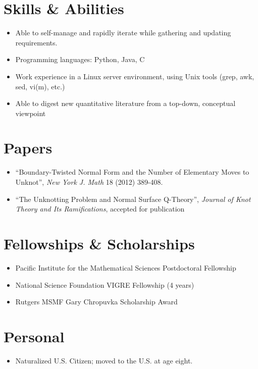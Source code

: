 \documentclass[margin]{res}
\def\tightlist{}
\begin{document}
\begin{resume}
\section{Skills \& Abilities}\label{skills-abilities}

\begin{itemize}
\tightlist
\item
  Able to self-manage and rapidly iterate while gathering and updating
  requirements.
\item
  Programming languages: {Python}, {Java}, {C}
\item
  Work experience in a Linux server environment, using Unix tools (grep,
  awk, sed, vi(m), etc.)
\item
  Able to digest new quantitative literature from a top-down, conceptual
  viewpoint
\end{itemize}

\section{Papers}\label{papers}

\begin{itemize}
\tightlist
\item
  ``Boundary-Twisted Normal Form and the Number of Elementary Moves to
  Unknot'', \emph{New York J. Math} 18 (2012) 389-408.
\item
  ``The Unknotting Problem and Normal Surface Q-Theory'', \emph{Journal
  of Knot Theory and Its Ramifications}, accepted for publication
\end{itemize}

\section{Fellowships \& Scholarships}\label{fellowships-scholarships}

\begin{itemize}
\tightlist
\item
  Pacific Institute for the Mathematical Sciences Postdoctoral
  Fellowship
\item
  National Science Foundation VIGRE Fellowship (4 years)
\item
  Rutgers MSMF Gary Chropuvka Scholarship Award
\end{itemize}

\section{Personal}\label{personal}

\begin{itemize}
\tightlist
\item
  Naturalized U.S. Citizen; moved to the U.S. at age eight.
\end{itemize}

\end{resume}
\end{document}
